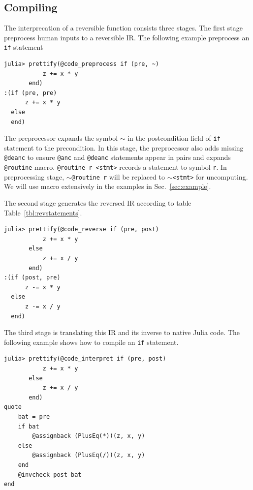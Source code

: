 \documentclass[aps,twocolumn,longbibliography,english,superscriptaddress]{revtex4-1}
\newcommand{\<}{\langle}
\renewcommand{\>}{\rangle}
\newcommand{\Tbl}[1]{Table~\ref{#1}}
\newcommand{\Sec}[1]{Sec.~\ref{#1}}
\theoremstyle{definition}\newtheorem{definition}{\textit{Definition}}
\begin{document}
\subsection{Compiling}
The interprecation of a reversible function consists three stages.
The first stage preprocess human inputs to a reversible IR.
The following example preprocess an \texttt{if} statement

\begin{minipage}{.44\textwidth}
\begin{lstlisting}
julia> prettify(@code_preprocess if (pre, ~)
           z += x * y
       end)
:(if (pre, pre)
      z += x * y
  else
  end)
\end{lstlisting}
\end{minipage}

The preprocessor expands the symbol \texttt{$\sim$} in the postcondition field of \texttt{if} statement to the precondition. In this stage, the preprocessor also adds missing \texttt{@deanc} to ensure \texttt{@anc} and \texttt{@deanc} statements appear in pairs and  expands \texttt{@routine} macro.
\texttt{@routine r <stmt>} records a statement to symbol \texttt{r}. In preprocessing stage, \texttt{$\sim$@routine r} will be replaced to \texttt{$\sim$<stmt>} for uncomputing. We will use macro extensively in the examples in \Sec{sec:example}.

The second stage generates the reversed IR according to table \Tbl{tbl:revstatements}.

\begin{minipage}{.44\textwidth}
\begin{lstlisting}
julia> prettify(@code_reverse if (pre, post)
           z += x * y
       else
           z += x / y
       end)
:(if (post, pre)
      z -= x * y
  else
      z -= x / y
  end)
\end{lstlisting}
\end{minipage}

The third stage is translating this IR and its inverse to native Julia code. The following example shows how to compile an \texttt{if} statement.

\begin{minipage}{.44\textwidth}
\begin{lstlisting}
julia> prettify(@code_interpret if (pre, post)
           z += x * y
       else
           z += x / y
       end)
quote
    bat = pre
    if bat
        @assignback (PlusEq(*))(z, x, y)
    else
        @assignback (PlusEq(/))(z, x, y)
    end
    @invcheck post bat
end
\end{lstlisting}
\end{minipage}
\end{document}
